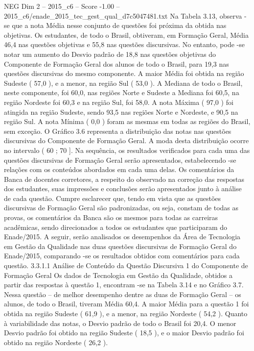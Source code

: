 \begin{textsample}{NEG Dim 2 – 2015\_c6 – Score -1.00 – 2015\_c6/enade\_2015\_tec\_gest\_qual\_d7c5047481.txt}
Na Tabela 3.13, observa -se que a nota Média nesse conjunto de questões foi próxima da obtida nas objetivas.
Os estudantes, de todo o Brasil, obtiveram, em Formação Geral, Média 46,4 nas questões objetivas e 55,8 nas questões discursivas.
No entanto, pode -se notar um aumento do Desvio padrão de 18,8 nas questões objetivas do Componente de Formação Geral dos alunos de todo o Brasil, para 19,3 nas questões discursivas do mesmo componente.
A maior Média foi obtida na região Sudeste ( 57,0 ), e a menor, na região Sul ( 53,0 ).
A Mediana de todo o Brasil, neste componente, foi 60,0, nas regiões Norte e Sudeste a Mediana foi 60,5, na região Nordeste foi 60,3 e na região Sul, foi 58,0.
A nota Máxima ( 97,0 ) foi atingida na região Sudeste, sendo 93,5 nas regiões Norte e Nordeste, e 90,5 na região Sul.
A nota Mínima ( 0,0 ) foram as mesmas em todas as regiões do Brasil, sem exceção.
O Gráfico 3.6 representa a distribuição das notas nas questões discursivas do Componente de Formação Geral.
A moda desta distribuição ocorre no intervalo ( 60 ; 70 ].
Na sequência, os resultados verificados para cada uma das questões discursivas de Formação Geral serão apresentados, estabelecendo -se relações com os conteúdos abordados em cada uma delas.
Os comentários da Banca de docentes corretores, a respeito do observado na correção das respostas dos estudantes, suas impressões e conclusões serão apresentados junto à análise de cada questão.
Cumpre esclarecer que, tendo em vista que as questões discursivas de Formação Geral são padronizadas, ou seja, constam de todas as provas, os comentários da Banca são os mesmos para todas as carreiras acadêmicas, sendo direcionados a todos os estudantes que participaram do Enade/2015.
A seguir, serão analisados os desempenhos da Área de Tecnologia em Gestão da Qualidade nas duas questões discursivas de Formação Geral do Enade/2015, comparando -se os resultados obtidos com comentários para cada questão. 3.3.1.1 Análise de Conteúdo da Questão Discursiva 1 do Componente de Formação Geral Os dados de Tecnologia em Gestão da Qualidade, obtidos a partir das respostas à questão 1, encontram -se na Tabela 3.14 e no Gráfico 3.7.
Nessa questão – de melhor desempenho dentre as duas de Formação Geral – os alunos, de todo o Brasil, tiveram Média 60,4.
A maior Média para a questão 1 foi obtida na região Sudeste ( 61,9 ), e a menor, na região Nordeste ( 54,2 ).
Quanto à variabilidade das notas, o Desvio padrão de todo o Brasil foi 20,4.
O menor Desvio padrão foi obtido na região Sudeste ( 18,5 ), e o maior Desvio padrão foi obtido na região Nordeste ( 26,2 ).

\end{textsample}
